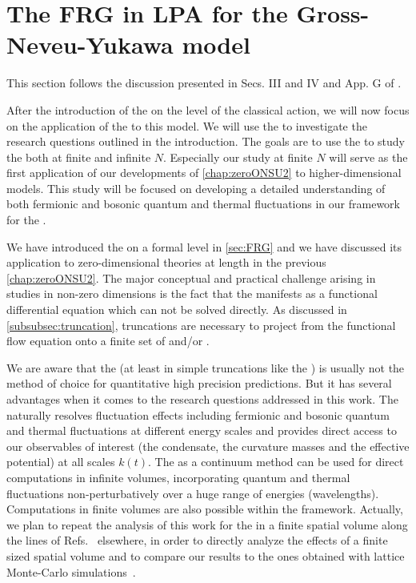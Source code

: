 \section{The FRG in LPA for the Gross-Neveu-Yukawa model}\label{sec:gny_frg}
\begin{disclaimer}
	This section follows the discussion presented in Secs. III and IV and App. G of .
\end{disclaimer}
After the introduction of the \gnyBm{} on the level of the classical action, we will now focus on the application of the \frg{} to this model.
We will use the \frg{} to investigate the research questions outlined in the introduction.
The goals are to use the \frg{} to study the \gnyBm{} both at finite and infinite $N$.
Especially our study at finite $N$ will serve as the first application of our developments of \cref{chap:zeroONSU2} to higher-dimensional models.
This study will be focused on developing a detailed understanding of both fermionic and bosonic quantum and thermal fluctuations in our \cfd{} framework for the \frg{}.\bigskip

We have introduced the \frg{} on a formal level in \cref{sec:FRG} and we have discussed its application to zero-dimensional theories at length in the previous \cref{chap:zeroONSU2}. 
The major conceptual and practical challenge arising in \frg{} studies in non-zero dimensions is the fact that the \frgEq{} manifests as a functional differential equation which can not be solved directly.
As discussed in \cref{subsubsec:truncation}, truncations are necessary to project from the functional flow equation onto a finite set of \odes{} and/or \pdes{}.

We are aware that the \frg{} (at least in simple truncations like the \lpa{}) is usually not the method of choice for quantitative high precision predictions. 
But it has several advantages when it comes to the research questions addressed in this work. 
The \frg{} naturally resolves fluctuation effects \dash{} including fermionic and bosonic quantum and thermal fluctuations \dash{} at different energy scales and provides direct access to our observables of interest (the condensate, the curvature masses and the effective potential) at all scales $k ( t )$. 
The \frg{} as a continuum method can be used for direct computations in infinite volumes, incorporating quantum and thermal fluctuations non-perturbatively over a huge range of energies (wavelengths).
Computations in finite volumes are also possible within the \frg{} framework.
Actually, we plan to repeat the analysis of this work for the \gnym{} in a finite spatial volume along the lines of Refs.~\cite{Braun:2004yk,Braun:2005gy,Braun:2005fj,Braun:2011iz,Braun:2011uq} elsewhere, in order to directly analyze the effects of a finite sized spatial volume and to compare our results to the ones obtained with lattice Monte-Carlo simulations~\cite{Cohen:1981qz,Cohen:1983nr,Karsch:1986hm,Lenz:2020bxk,Lenz:2020cuv,Pannullo:2019bfn,Pannullo:2019prx}.
	
